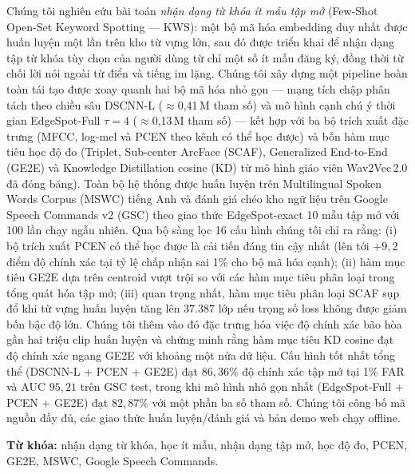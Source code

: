 \documentclass[12pt,a4paper]{report}
\begin{document}
Chúng tôi nghiên cứu bài toán \emph{nhận dạng từ khóa ít mẫu tập mở} (Few-Shot
Open-Set Keyword Spotting --- KWS): một bộ mã hóa embedding duy nhất được huấn
luyện một lần trên kho từ vựng lớn, sau đó được triển khai để nhận dạng tập từ
khóa tùy chọn của người dùng từ chỉ một số ít mẫu đăng ký, đồng thời từ chối
lời nói ngoài từ điển và tiếng im lặng. Chúng tôi xây dựng một pipeline hoàn
toàn tái tạo được xoay quanh hai bộ mã hóa nhỏ gọn --- mạng tích chập phân tách
theo chiều sâu DSCNN-L ($\approx$0{,}41\,M tham số) và mô hình cạnh chú ý thời gian
EdgeSpot-Full $\tau{=}4$ ($\approx$0{,}13\,M tham số) --- kết hợp với ba bộ trích
xuất đặc trưng (MFCC, log-mel và PCEN theo kênh có thể học được) và bốn hàm mục
tiêu học độ đo (Triplet, Sub-center ArcFace (SCAF), Generalized End-to-End (GE2E)
và Knowledge Distillation cosine (KD) từ mô hình giáo viên Wav2Vec\,2.0 đã đóng
băng). Toàn bộ hệ thống được huấn luyện trên Multilingual Spoken Words Corpus
(MSWC) tiếng Anh và đánh giá chéo kho ngữ liệu trên Google Speech Commands v2
(GSC) theo giao thức EdgeSpot-exact 10 mẫu tập mở với 100 lần chạy ngẫu nhiên.
Qua bộ sàng lọc 16 cấu hình chúng tôi chỉ ra rằng:
(i) bộ trích xuất PCEN có thể học được là cải tiến đáng tin cậy nhất (lên tới
$+9{,}2$ điểm độ chính xác tại tỷ lệ chấp nhận sai 1\% cho bộ mã hóa cạnh);
(ii) hàm mục tiêu GE2E dựa trên centroid vượt trội so với các hàm mục tiêu phân
loại trong tổng quát hóa tập mở;
(iii) quan trọng nhất, hàm mục tiêu phân loại SCAF sụp đổ khi từ vựng huấn luyện
tăng lên $37{.}387$ lớp nếu trọng số loss không được giảm bốn bậc độ lớn.
Chúng tôi thêm vào đó đặc trưng hóa việc độ chính xác bão hòa gần hai triệu
clip huấn luyện và chứng minh rằng hàm mục tiêu KD cosine đạt độ chính xác ngang
GE2E với khoảng một nửa dữ liệu. Cấu hình tốt nhất tổng thể (DSCNN-L + PCEN +
GE2E) đạt $86{,}36\%$ độ chính xác tập mở tại 1\% FAR và AUC $95{,}21$ trên GSC
test, trong khi mô hình nhỏ gọn nhất (EdgeSpot-Full + PCEN + GE2E) đạt $82{,}87\%$
với một phần ba số tham số. Chúng tôi công bố mã nguồn đầy đủ, các giao thức
huấn luyện/đánh giá và bản demo web chạy offline.

\bigskip
\noindent\textbf{Từ khóa:} nhận dạng từ khóa, học ít mẫu, nhận dạng tập mở, học
độ đo, PCEN, GE2E, MSWC, Google Speech Commands.

\tableofcontents

\clearpage
{}
\end{document}
